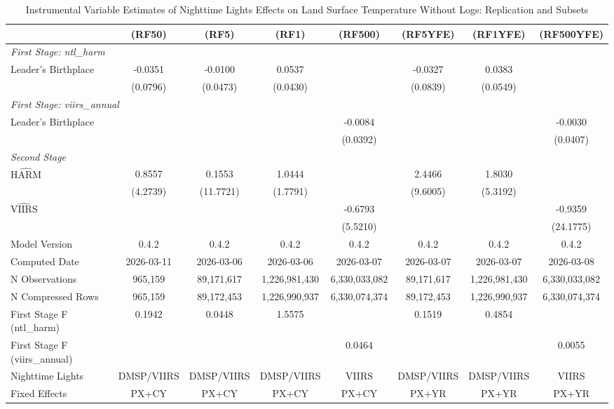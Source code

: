 \begin{table}[htbp]
\centering
\footnotesize
\caption{Instrumental Variable Estimates of Nighttime Lights Effects on Land Surface Temperature Without Logs: Replication and Subsets}
\begin{tabular}{lccccccc}
\toprule
 & (RF50) & (RF5) & (RF1) & (RF500) & (RF5YFE) & (RF1YFE) & (RF500YFE) \\
\midrule
\midrule
\multicolumn{8}{l}{\textit{First Stage: ntl\_harm}} \\
  Leader's Birthplace & -0.0351 & -0.0100 & 0.0537 &  & -0.0327 & 0.0383 &  \\
 & (0.0796) & (0.0473) & (0.0430) &  & (0.0839) & (0.0549) &  \\
\midrule
\multicolumn{8}{l}{\textit{First Stage: viirs\_annual}} \\
  Leader's Birthplace &  &  &  & -0.0084 &  &  & -0.0030 \\
 &  &  &  & (0.0392) &  &  & (0.0407) \\
\midrule
\multicolumn{8}{l}{\textit{Second Stage}} \\
$\hat{\text{HARM}}$ & 0.8557 & 0.1553 & 1.0444 &  & 2.4466 & 1.8030 &  \\
 & (4.2739) & (11.7721) & (1.7791) &  & (9.6005) & (5.3192) &  \\
$\hat{\text{VIIRS}}$ &  &  &  & -0.6793 &  &  & -0.9359 \\
 &  &  &  & (5.5210) &  &  & (24.1775) \\
\midrule
Model Version & 0.4.2 & 0.4.2 & 0.4.2 & 0.4.2 & 0.4.2 & 0.4.2 & 0.4.2 \\
Computed Date & 2026-03-11 & 2026-03-06 & 2026-03-06 & 2026-03-07 & 2026-03-07 & 2026-03-07 & 2026-03-08 \\
N Observations & 965,159 & 89,171,617 & 1,226,981,430 & 6,330,033,082 & 89,171,617 & 1,226,981,430 & 6,330,033,082 \\
N Compressed Rows & 965,159 & 89,172,453 & 1,226,990,937 & 6,330,074,374 & 89,172,453 & 1,226,990,937 & 6,330,074,374 \\
First Stage F (ntl\_harm) & 0.1942 & 0.0448 & 1.5575 &  & 0.1519 & 0.4854 &  \\
First Stage F (viirs\_annual) &  &  &  & 0.0464 &  &  & 0.0055 \\
\midrule
Nighttime Lights & DMSP/VIIRS & DMSP/VIIRS & DMSP/VIIRS & VIIRS & DMSP/VIIRS & DMSP/VIIRS & VIIRS \\
Fixed Effects & PX+CY & PX+CY & PX+CY & PX+CY & PX+YR & PX+YR & PX+YR \\

\end{tabular}
\end{table}
